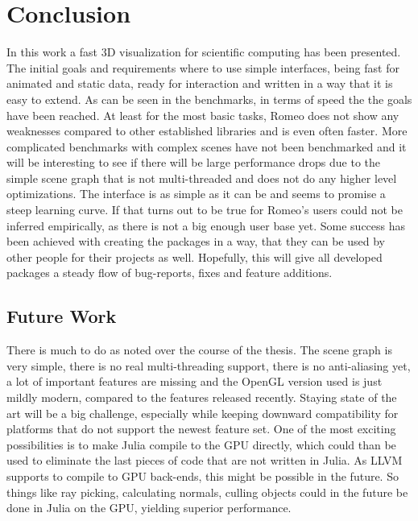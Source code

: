 \section{Conclusion}
In this work a fast 3D visualization for scientific computing has been presented. 
The initial goals and requirements where to use simple interfaces, being fast for animated and static data, ready for interaction and written in a way that it is easy to extend.
As can be seen in the benchmarks, in terms of speed the the goals have been reached. At least for the most basic tasks, Romeo does not show any weaknesses compared to other established libraries and is even often faster.
More complicated benchmarks with complex scenes have not been benchmarked and it will be interesting to see if there will be large performance drops due to the simple scene graph that is not multi-threaded and does not do any higher level optimizations.
The interface is as simple as it can be and seems to promise a steep learning curve. If that turns out to be true for Romeo's users could not be inferred empirically, as there is not a big enough user base yet. Some success has been achieved with creating the packages in a way, that they can be used by other people for their projects as well. Hopefully, this will give all developed packages a steady flow of bug-reports, fixes and feature additions.


\subsection{Future Work}

There is much to do as noted over the course of the thesis. The scene graph is very simple, there is no real multi-threading support, there is no anti-aliasing yet, a lot of important features are missing and the OpenGL version used is just mildly modern, compared to the features released recently. Staying state of the art will be a big challenge, especially while keeping downward compatibility for platforms that do not support the newest feature set.
One of the most exciting possibilities is to make Julia compile to the GPU directly, which could than be used to eliminate the last pieces of code that are not written in Julia. As \ac{LLVM} supports to compile to GPU back-ends, this might be possible in the future.
So things like ray picking, calculating normals, culling objects could in the future be done in Julia on the GPU, yielding superior performance.